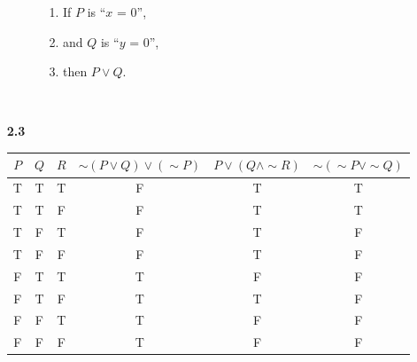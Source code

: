 \documentclass[16pt]{article}
\begin{document}
\begin{enumerate}
\begin{enumerate}
        \begin{enumerate}
            \item[1.] If $P$ is ``$x$ = 0'',
            \item[2.] and $Q$ is ``$y$ = 0'',
            \item[3.] then \(P \lor Q\).
        \end{enumerate}
    \end{enumerate}
    \\
    \item[\textbf{2.3  }]
    \begin{tabular}{ |c|c|c|c|c|c|} 
        \hline
        $P$ & $Q$ & $R$ & $\sim (P\lor Q)\lor (\sim P)$ & $P \lor (Q \land \sim R)$ & $\sim (\sim P \lor \sim Q)$\\
        \hline
        T & T & T & F & T & T\\ 
        \hline
        T & T & F & F & T & T\\ 
        \hline
        T & F & T & F & T & F\\ 
        \hline
        T & F & F & F & T & F\\
        \hline
        F & T & T & T & F & F\\
        \hline
        F & T & F & T & T & F\\
        \hline
        F & F & T & T & F & F\\
        \hline
        F & F & F & T & F & F\\
        \hline
    \end{tabular}
    
\end{enumerate}
\end{document}
